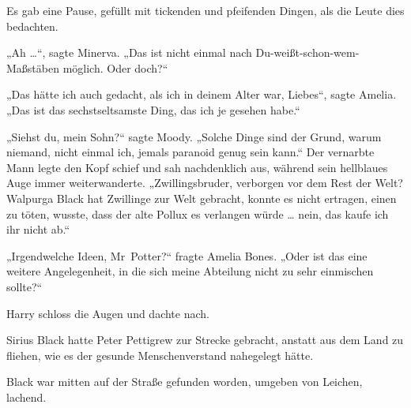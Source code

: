 Es gab eine Pause, gefüllt mit tickenden und pfeifenden Dingen, als die Leute dies bedachten.

„Ah …“, sagte Minerva.
„Das ist nicht einmal nach Du-weißt-schon-wem-Maßstäben möglich. Oder doch?“

„Das hätte ich auch gedacht, als ich in deinem Alter war, Liebes“, sagte Amelia.
„Das ist das sechstseltsamste Ding, das ich je gesehen habe.“

„Siehst du, mein Sohn?“ sagte Moody.
„Solche Dinge sind der Grund, warum niemand, nicht einmal ich, jemals paranoid genug sein kann.“
Der vernarbte Mann legte den Kopf schief und sah nachdenklich aus, während sein hellblaues Auge immer weiterwanderte.
„Zwillingsbruder, verborgen vor dem Rest der Welt? Walpurga Black hat Zwillinge zur Welt gebracht, konnte es nicht ertragen, einen zu töten, wusste, dass der alte Pollux es verlangen würde … nein, das kaufe ich ihr nicht ab.“

„Irgendwelche Ideen, Mr~Potter?“ fragte Amelia Bones.
„Oder ist das eine weitere Angelegenheit, in die sich meine Abteilung nicht zu sehr einmischen sollte?“

Harry schloss die Augen und dachte nach.

Sirius Black hatte Peter Pettigrew zur Strecke gebracht, anstatt aus dem Land zu fliehen, wie es der gesunde Menschenverstand nahegelegt hätte.

Black war mitten auf der Straße gefunden worden, umgeben von Leichen, lachend.

